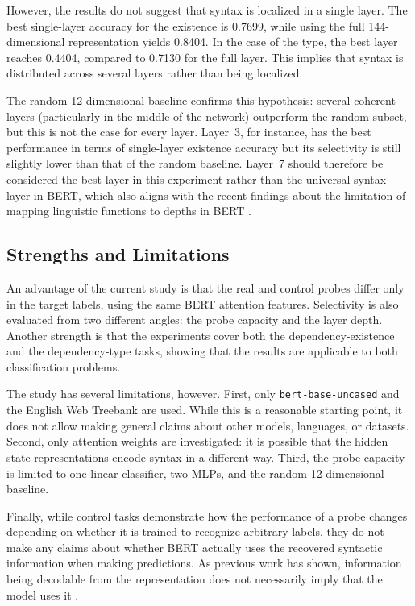 \documentclass[12pt,a4paper]{article}
\begin{document}
However, the results do not suggest that syntax is localized in a single layer. The best single-layer accuracy for the existence is 0.7699, while using the full 144-dimensional representation yields 0.8404. In the case of the type, the best layer reaches 0.4404, compared to 0.7130 for the full layer. This implies that syntax is distributed across several layers rather than being localized.

The random 12-dimensional baseline confirms this hypothesis: several coherent layers (particularly in the middle of the network) outperform the random subset, but this is not the case for every layer. Layer~3, for instance, has the best performance in terms of single-layer existence accuracy but its selectivity is still slightly lower than that of the random baseline. Layer~7 should therefore be considered the best layer in this experiment rather than the universal syntax layer in BERT, which also aligns with the recent findings about the limitation of mapping linguistic functions to depths in BERT \cite{niu2022pipeline}.

\subsection{Strengths and Limitations}

An advantage of the current study is that the real and control probes differ only in the target labels, using the same BERT attention features. Selectivity is also evaluated from two different angles: the probe capacity and the layer depth. Another strength is that the experiments cover both the dependency-existence and the dependency-type tasks, showing that the results are applicable to both classification problems.

The study has several limitations, however. First, only \texttt{bert-base-uncased} and the English Web Treebank are used. While this is a reasonable starting point, it does not allow making general claims about other models, languages, or datasets. Second, only attention weights are investigated: it is possible that the hidden state representations encode syntax in a different way. Third, the probe capacity is limited to one linear classifier, two MLPs, and the random 12-dimensional baseline.

Finally, while control tasks demonstrate how the performance of a probe changes depending on whether it is trained to recognize arbitrary labels, they do not make any claims about whether BERT actually uses the recovered syntactic information when making predictions. As previous work has shown, information being decodable from the representation does not necessarily imply that the model uses it \cite{rogers2020primer,belinkov2022probing}.
\end{document}
